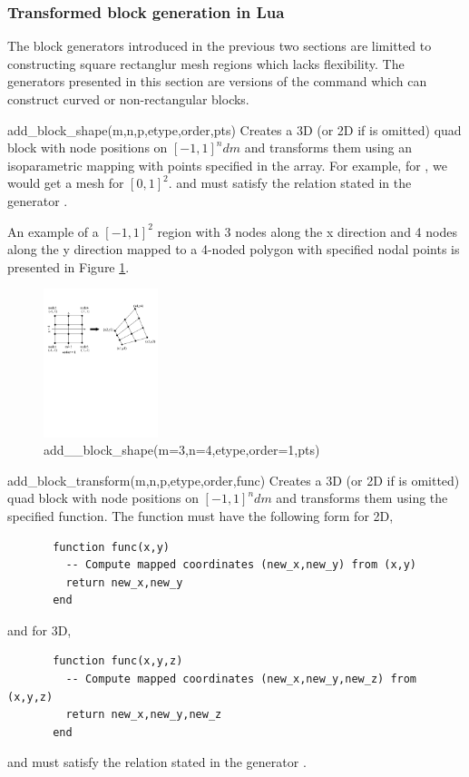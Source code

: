 \begin{codelist}
\end{codelist}

\clearpage
\subsubsection{Transformed block generation in Lua}
The block generators introduced in the previous two sections
are limitted to constructing square rectanglur mesh regions
which lacks flexibility. The generators presented in this 
section are versions of the  command which can 
construct curved or non-rectangular blocks.
\begin{codelist}
  \item[add\_block\_shape(m,n,p,etype,order,pts)] 
    Creates a 3D (or 2D if  is omitted) quad block with node
    positions on $[-1,1]^ndm$ and transforms them using an isoparametric
    mapping with points specified in the  array.  For
    example, for , we would get a
    mesh for $[0,1]^2$.
     and  must satisfy the relation stated in the 
    generator . 

    An example of a $[-1,1]^2$ region with 3 nodes along the x direction and
    4 nodes along the y direction mapped to a 4-noded polygon with 
    specified nodal points is presented in Figure \ref{fig:AddBlockShape}.
    \begin{figure}[htbp]
    \centering
    \includegraphics[trim=0.0in 5.5in 0.0in 1.0in, clip, height=1.7in]{fig/block_shape.pdf}
    \caption{add\_\_block\_shape(m=3,n=4,etype,order=1,pts)}
    \label{fig:AddBlockShape}
    \end{figure}

  \item[add\_block\_transform(m,n,p,etype,order,func)] 
    Creates a 3D (or 2D if  is omitted) quad block with node
    positions on $[-1,1]^ndm$ and transforms them using the specified
    function. The function  must have the following form for 2D,
    \begin{verbatim}
       function func(x,y)
         -- Compute mapped coordinates (new_x,new_y) from (x,y)
         return new_x,new_y
       end
    \end{verbatim}
    and for 3D,
    \begin{verbatim}
       function func(x,y,z)
         -- Compute mapped coordinates (new_x,new_y,new_z) from (x,y,z)
         return new_x,new_y,new_z
       end
    \end{verbatim}
     and  must satisfy the relation stated in the 
    generator . 


\end{codelist}
